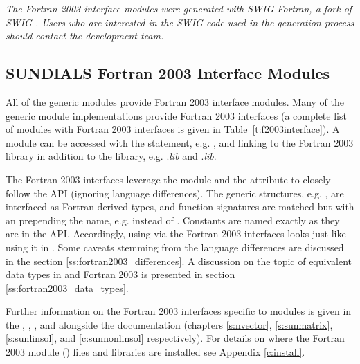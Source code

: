 \textit{The Fortran 2003 interface modules were generated with SWIG Fortran, a
fork of SWIG \cite{Swig-Fortran}. Users who are interested in the SWIG code used
in the generation process should contact the {\sundials} development team.}

\subsection{SUNDIALS Fortran 2003 Interface Modules}

All of the generic {\sundials} modules provide Fortran 2003 interface modules.
Many of the generic module implementations provide Fortran 2003 interfaces
(a complete list of modules with Fortran 2003 interfaces is given in
Table~\ref{t:f2003interface}). A module can be accessed with the 
statement, e.g. , and linking to the Fortran
2003 library in addition to the {\CC} library, e.g.
.{\em lib} and
.{\em lib}.

The Fortran 2003 interfaces leverage the  module and the
 attribute to closely follow the {\sundials} {\CC} API (ignoring
language differences). The generic {\sundials} structures, e.g. ,
are interfaced as Fortran derived types, and function signatures are matched
but with an  prepending the name, e.g.  instead of
. Constants are named exactly as they are in the {\CC} API.
Accordingly, using {\sundials} via the Fortran 2003 interfaces looks just like
using it in {\CC}. Some caveats stemming from the language differences are
discussed in the section \ref{ss:fortran2003_differences}. A discussion on the
topic of equivalent data types in {\CC} and Fortran 2003 is presented in
section \ref{ss:fortran2003_data_types}.

Further information on the Fortran 2003 interfaces specific to modules is given
in the {\nvector}, {\sunmatrix}, {\sunlinsol}, and {\sunnonlinsol} alongside
the {\CC} documentation (chapters \ref{s:nvector}, \ref{s:sunmatrix},
\ref{s:sunlinsol}, and \ref{c:sunnonlinsol} respectively). For details on where
the Fortran 2003 module () files and libraries are installed see Appendix
\ref{c:install}.

